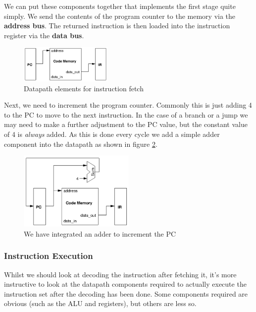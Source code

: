 \documentclass{article}
\begin{document}
	\par We can put these components together that implements the first stage quite simply. We send the contents of the program counter to the memory via the \textbf{address bus}. The returned instruction is then loaded into the instruction register via the \textbf{data bus}.
	
	\begin{figure}[ht]
		\centering
		\includegraphics[width=0.4\textwidth]{datapath_instruction_fetch}
		\caption{Datapath elements for instruction fetch}
		\label{fig:datapath instruction fetch}
	\end{figure}
	
	Next, we need to increment the program counter. Commonly this is just adding 4 to the PC to move to the next instruction. In the case of a branch or a jump we may need to make a further adjustment to the PC value, but the constant value of 4 is \textit{always} added. As this is done every cycle we add a simple adder component into the datapath as shown in figure \ref{fig:datapath_pc_adder}.
	
	\begin{figure}[ht]
		\centering
		\includegraphics[width=0.5\textwidth]{datapath_pc_adder}
		\caption{We have integrated an adder to increment the PC}
		\label{fig:datapath_pc_adder}
	\end{figure}
	
	\subsubsection{Instruction Execution}
	Whilst we should look at decoding the instruction after fetching it, it's more instructive to look at the datapath components required to actually execute the instruction set after the decoding has been done. Some components required are obvious (such as the ALU and registers), but others are less so.
	
\end{document}
